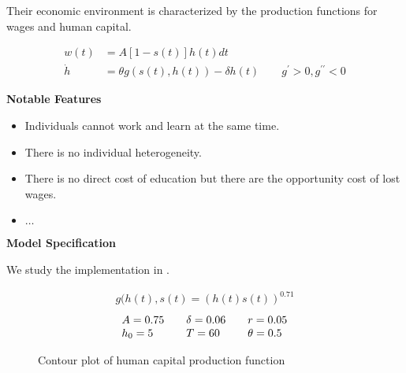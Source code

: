 \begin{frame}
Their economic environment is characterized by the production functions for wages and human capital.

\begin{align*}
w(t)    & = A[1 - s(t)]h(t)dt \\
\dot{h} & = \theta g(s(t),h(t)) - \delta h(t) \qquad g^\prime > 0, g^{\prime\prime} < 0
\end{align*}

\end{frame}
\begin{frame}\textbf{Notable Features}\vspace{0.3cm}

\begin{itemize}\setlength\itemsep{1em}
\item Individuals cannot work and learn at the same time.
\item There is no individual heterogeneity.
\item There is no direct cost of education but there are the opportunity cost of lost wages.
\item $\hdots$
\end{itemize}

\end{frame}
\begin{frame}\textbf{Model Specification}\vspace{0.3cm}

We study the implementation in .

\begin{align*}
	g(h(t), s(t) = \left(h(t) s(t)\right)^{0.71}
\end{align*}\vspace{-1.0cm}
\begin{align*}\begin{array}{l@{\qquad}l@{\qquad}l}
	A = 0.75 & \delta = 0.06 & r = 0.05\\
	h_0 = 5 & T = 60 & \theta = 0.5
\end{array}\end{align*}
\end{frame}

\begin{frame}\begin{figure}[htp]\centering
\caption{Contour plot of human capital production function}
\end{figure}\end{frame}

